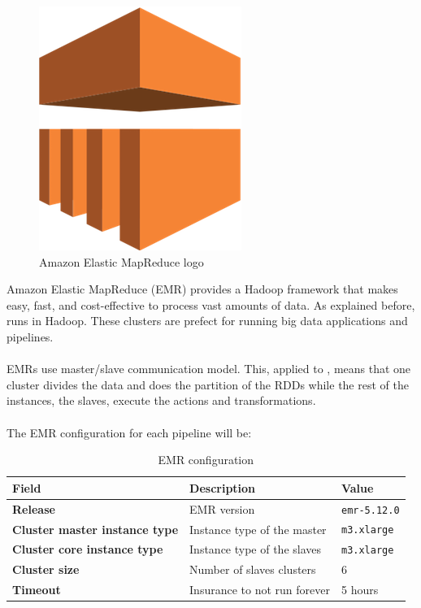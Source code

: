 \begin{figure}[H]
\centering
\includegraphics[scale=0.1]{resources/emr-logo.png}
\caption{Amazon Elastic MapReduce logo}
\end{figure}

Amazon Elastic MapReduce\cite{emr} (EMR) provides a Hadoop\cite{hadoop} framework that makes easy, fast, and cost-effective to process vast amounts of data. As explained before,  runs in Hadoop. These clusters are prefect for running big data applications and pipelines.
\\\\
EMRs use master/slave communication model. This, applied to , means that one cluster divides the data and does the partition of the RDDs while the rest of the instances, the slaves, execute the actions and transformations.
\\\\
The EMR configuration for each pipeline will be:

\begin{table}[H]
\centering
\begin{tabular}{|p{5cm}|p{5cm}|p{3cm}|}
\hline
\textbf{Field}                        & \textbf{Description}         & \textbf{Value}      \\ \hline
\textbf{Release}                      & EMR version                  & \texttt{emr-5.12.0} \\ \hline
\textbf{Cluster master instance type} & Instance type of the master  & \texttt{m3.xlarge}  \\ \hline
\textbf{Cluster core instance type}   & Instance type of the slaves  & \texttt{m3.xlarge}  \\ \hline
\textbf{Cluster size}                 & Number of slaves clusters    & 6                   \\ \hline
\textbf{Timeout}                      & Insurance to not run forever & 5 hours             \\ \hline
\end{tabular}
\caption{EMR configuration}
\end{table}

